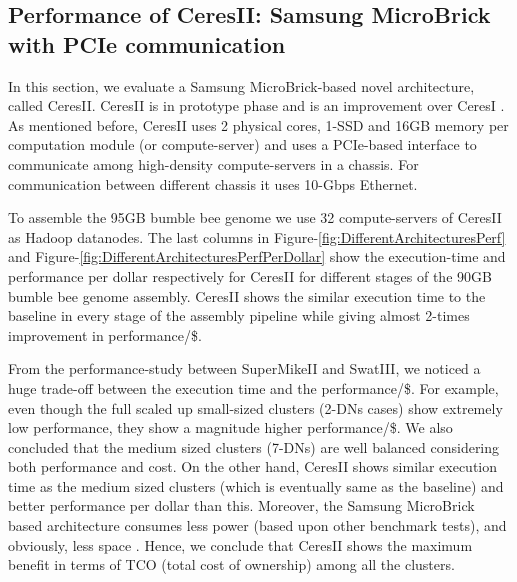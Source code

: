 \documentclass[conference]{IEEEtran}
\begin{document}
\subsection {Performance of CeresII: Samsung MicroBrick with PCIe communication} \label{CeresII:Scaledout-in-a-boxAndSSD}
In this section, we evaluate a Samsung MicroBrick-based novel architecture, called CeresII. CeresII is in prototype phase and is an improvement over CeresI \cite{Cluster:ceres1}. As mentioned before, CeresII uses 2 physical cores, 1-SSD and 16GB memory per computation module (or compute-server) and uses a PCIe-based interface to communicate among high-density compute-servers in a chassis. For communication between different chassis it uses 10-Gbps Ethernet.

To assemble the 95GB bumble bee genome we use 32 compute-servers of CeresII as Hadoop datanodes. The last columns in Figure-\ref{fig:DifferentArchitecturesPerf} and Figure-\ref{fig:DifferentArchitecturesPerfPerDollar} show the execution-time and performance per dollar respectively for CeresII for different stages of the 90GB bumble bee genome assembly. CeresII shows the similar execution time to the baseline in every stage of the assembly pipeline while giving almost 2-times improvement in performance/\$.

From the performance-study between SuperMikeII and SwatIII, we noticed a huge trade-off between the execution time and the performance/\$. For example, even though the full scaled up small-sized clusters (2-DNs cases) show extremely low performance, they show a magnitude higher performance/\$. We also concluded that the medium sized clusters (7-DNs) are well balanced considering both performance and cost. On the other hand, CeresII shows similar execution time as the medium sized clusters (which is eventually same as the baseline) and better performance per dollar than this. Moreover, the Samsung MicroBrick based architecture consumes less power (based upon other benchmark tests), and obviously, less space \cite{Cluster:ceres1}. Hence, we conclude that CeresII shows the maximum benefit in terms of TCO (total cost of ownership) among all the clusters.
\end{document}
